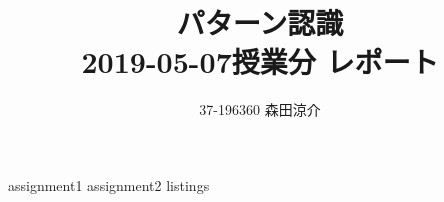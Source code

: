 \documentclass[dvipdfmx, fleqn]{jsarticle}
\title{
    パターン認識 \\
    2019-05-07授業分 レポート
    }
\author{37-196360 \quad 森田涼介}
\begin{document}
\maketitle
{assignment1}
\clearpage
{assignment2}
\clearpage
{listings}
\end{document}
